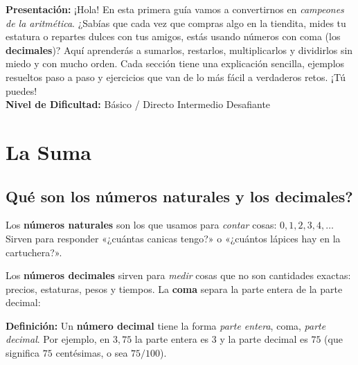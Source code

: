 \documentclass[12pt, letterpaper]{article}
\begin{document}


\vspace{4pt}
\begin{cuadroinfo}
  \small
  \textbf{Presentación:} ¡Hola! En esta primera guía vamos a convertirnos en \emph{campeones de la aritmética}. ¿Sabías que cada vez que compras algo en la tiendita, mides tu estatura o repartes dulces con tus amigos, estás usando números con coma (los \textbf{decimales})? Aquí aprenderás a sumarlos, restarlos, multiplicarlos y dividirlos sin miedo y con mucho orden. Cada sección tiene una explicación sencilla, ejemplos resueltos paso a paso y ejercicios que van de lo más fácil a verdaderos retos. ¡Tú puedes!
  \\[4pt]
  \textbf{Nivel de Dificultad:}\quad
  \facil{} Básico / Directo \quad
  \medio{} Intermedio \quad
  \dificil{} Desafiante
\end{cuadroinfo}

\vspace{8pt}

\section{La Suma}

\subsection{\textquestiondown Qué son los números naturales y los decimales?}

Los \textbf{números naturales} son los que usamos para \emph{contar} cosas: $0, 1, 2, 3, 4, \dots$ Sirven para responder «¿cuántas canicas tengo?» o «¿cuántos lápices hay en la cartuchera?».

Los \textbf{números decimales} sirven para \emph{medir} cosas que no son cantidades exactas: precios, estaturas, pesos y tiempos. La \textbf{coma} separa la parte entera de la parte decimal:

\begin{cuadroteoria}
  \textbf{Definición:} Un \textbf{número decimal} tiene la forma \emph{parte entera}, coma, \emph{parte decimal}. Por ejemplo, en $3{,}75$ la parte entera es $3$ y la parte decimal es $75$ (que significa $75$ centésimas, o sea $75/100$).
\end{cuadroteoria}
\end{document}
